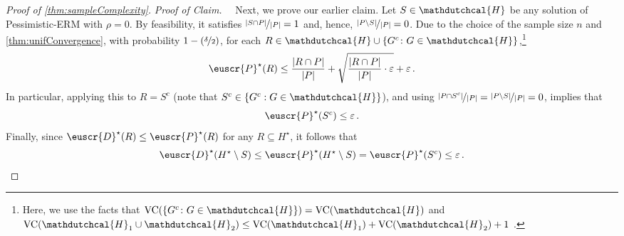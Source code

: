 \documentclass[11pt]{article}
\theoremstyle{plain}
\theoremstyle{definition}
\theoremstyle{remark}
\def\abs#1{\left| #1 \right|}
\newcommand{\inbrace}[1]{\left\{#1\right\}}
\newcommand{\inparen}[1]{\left(#1\right)}
\newcommand{\nfrac}[2]{\nicefrac{#1}{#2}}
\newcommand{\vc}{\textrm{\rm VC}}
\newcommand{\eps}{\varepsilon}
\newcommand{\customcal}[1]{\euscr{#1}}
\newcommand{\cD}{\customcal{D}}
\newcommand{\cP}{\customcal{P}}
\newcommand{\hypo}[1]{\mathdutchcal{#1}}
\newcommand{\hyH}{\hypo{H}}
\newcommand{\pERM}{Pessimistic-ERM}
\newcommand{\optset}{{H^\star}}
\newcommand{\cDtrue}{\cD^\star}
\newcommand{\cPtrue}{\cP^\star}
\begin{document}
\begin{proof}[Proof of \cref{thm:sampleComplexity}]
            \noindent \textit{Proof of Claim.}~~
            Next, we prove our earlier claim.
            Let $S\in\hyH$ be any solution of \pERM{} with $\rho=0$.
            By feasibility, it satisfies $\nfrac{\abs{S \cap P}}{\abs{P}}=1$ and, hence, $\nfrac{\abs{ P\setminus S}}{\abs{P}}=0$.
            Due to the choice of the sample size $n$ and \cref{thm:unifConvergence}, with probability $1-\inparen{\nfrac{\delta}{2}}$, for each $R\in \hyH\cup \inbrace{G^c\colon G\in \hyH}$,\footnote{Here, we use the facts that $\vc{(\inbrace{G^c\colon G\in \hyH})}=\vc{(\hyH)}$ and $\vc{(\hyH_1\cup\hyH_2)}\leq {\vc{(\hyH_1)}+\vc{(\hyH_2)}+1}$ \cite{mohri2018foundations}.}
            \[
                \cPtrue(R) 
                \leq 
                \frac{\abs{R\cap P}}{\abs{P}}
                +
                \sqrt{\frac{\abs{R\cap P}}{\abs{P}}\cdot \eps}
                + \eps\,.
            \]
            In particular, applying this to $R=S^c$ (note that $S^c\in\{G^c: G\in \hyH\}$), and using $\nfrac{\abs{ P\cap S^c}}{\abs{P}}=\nfrac{\abs{ P\setminus S}}{\abs{P}}=0$, implies that 
            \[
                \cPtrue(S^c) \leq \eps\,.
            \]
            Finally, since $\cDtrue( R )\leq \cPtrue( R )$ for any $ R \subseteq \optset$, it follows that 
            \[
                \cDtrue(\optset\setminus  S)
                \leq \cPtrue(\optset\setminus  S )
                = \cPtrue(S^c)
                \leq  \eps\,.
            \]  
        

\end{proof}
\end{document}
